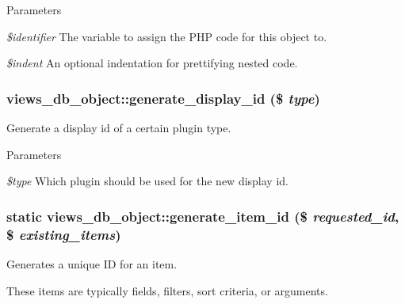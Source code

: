 \begin{DoxyParams}{Parameters}
\item[{\em \$identifier}]The variable to assign the PHP code for this object to. \item[{\em \$indent}]An optional indentation for prettifying nested code. \end{DoxyParams}
\hypertarget{classviews__db__object_ac768fb998e23528d06fcb139846094eb}{
\subsubsection[{generate\_\-display\_\-id}]{\setlength{\rightskip}{0pt plus 5cm}views\_\-db\_\-object::generate\_\-display\_\-id (\$ {\em type})}}
\label{classviews__db__object_ac768fb998e23528d06fcb139846094eb}
Generate a display id of a certain plugin type.


\begin{DoxyParams}{Parameters}
\item[{\em \$type}]Which plugin should be used for the new display id. \end{DoxyParams}
\hypertarget{classviews__db__object_a0826c7652b5ef3e3cc9feec98e4fa445}{
\subsubsection[{generate\_\-item\_\-id}]{\setlength{\rightskip}{0pt plus 5cm}static views\_\-db\_\-object::generate\_\-item\_\-id (\$ {\em requested\_\-id}, \/  \$ {\em existing\_\-items})}}
\label{classviews__db__object_a0826c7652b5ef3e3cc9feec98e4fa445}
Generates a unique ID for an item.

These items are typically fields, filters, sort criteria, or arguments.


